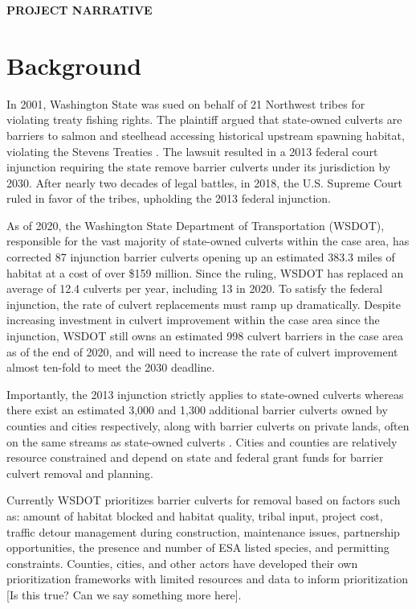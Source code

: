 \documentclass[12pt]{elsarticle}
\begin{document}
\begin{center} \textbf{PROJECT NARRATIVE} \end{center}


\section{Background} 
In 2001, Washington State was sued on behalf of 21 Northwest tribes for violating treaty fishing rights. The plaintiff argued that state-owned culverts are barriers to salmon and steelhead accessing historical upstream spawning habitat, violating the Stevens Treaties \citep{hickey2018highway}. The lawsuit resulted in a 2013 federal court injunction requiring the state remove barrier culverts under its jurisdiction by 2030. After nearly two decades of legal battles, in 2018, the U.S. Supreme Court ruled in favor of the tribes, upholding the 2013 federal injunction. 

As of 2020, the Washington State Department of Transportation (WSDOT), responsible for the vast majority of state-owned culverts within the case area, has corrected 87 injunction barrier culverts opening up an estimated 383.3 miles of habitat at a cost of over \$159 million. Since the ruling, WSDOT has replaced an average of 12.4 culverts per year, including 13 in 2020. To satisfy the federal injunction, the rate of culvert replacements must ramp up dramatically. Despite increasing investment in culvert improvement within the case area since the injunction, WSDOT still owns an estimated 998 culvert barriers in the case area as of the end of 2020, and will need to increase the rate of culvert improvement almost ten-fold to meet the 2030 deadline.  

Importantly, the 2013 injunction strictly applies to state-owned culverts whereas there exist an estimated 3,000 and 1,300 additional barrier culverts owned by counties and cities respectively, along with barrier culverts on private lands, often on the same streams as state-owned culverts \citep{brown2019coming}. Cities and counties are relatively resource constrained and depend on state and federal grant funds for barrier culvert removal and planning.

Currently WSDOT prioritizes barrier culverts for removal based on factors such as: amount of habitat blocked and habitat quality, tribal input, project cost, traffic detour management during construction, maintenance issues, partnership opportunities, the presence and number of ESA listed species, and permitting constraints. Counties, cities, and other actors have developed their own prioritization frameworks with limited resources and data to inform prioritization [Is this true? Can we say something more here]. 
\end{document}

